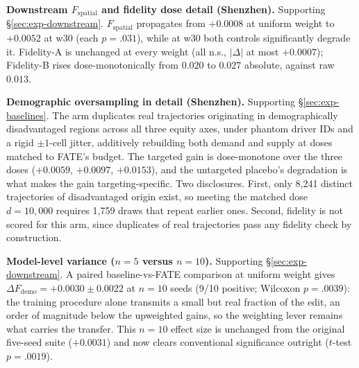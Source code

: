 \textbf{Downstream $F_{\mathrm{spatial}}$ and fidelity dose detail (Shenzhen).}
Supporting \S\ref{sec:exp-downstream}. $F_{\mathrm{spatial}}$ propagates from
$+0.0008$ at uniform weight to $+0.0052$ at w30 (each $p = .031$), while at w30
both controls significantly degrade it. Fidelity-A is unchanged at every weight
(all n.s., $|\Delta|$ at most $+0.0007$); Fidelity-B rises dose-monotonically
from $0.020$ to $0.027$ absolute, against raw $0.013$.

\textbf{Demographic oversampling in detail (Shenzhen).} Supporting
\S\ref{sec:exp-baselines}. The arm duplicates real trajectories originating in
demographically disadvantaged regions
\cite{kamirancalders2012,zietlow2022} across all three equity axes, under
phantom driver IDs and a rigid $\pm 1$-cell jitter, additively rebuilding both
demand and supply at doses matched to FATE's budget. The targeted gain is
dose-monotone over the three doses ($+0.0059$, $+0.0097$, $+0.0153$), and the
untargeted placebo's degradation is what makes the gain targeting-specific.
Two disclosures. First, only 8{,}241 distinct trajectories of disadvantaged
origin exist, so meeting the matched dose $d = 10{,}000$ requires 1{,}759
draws that repeat earlier ones. Second, fidelity is not scored for this arm,
since duplicates of real trajectories pass any fidelity check by construction.

\textbf{Model-level variance ($n = 5$ versus $n = 10$).} Supporting
\S\ref{sec:exp-downstream}. A paired baseline-vs-FATE comparison at uniform
weight gives $\Delta F_{\mathrm{demo}} = +0.0030 \pm 0.0022$ at $n = 10$
seeds (9/10 positive; Wilcoxon $p = .0039$): the training procedure alone
transmits a small but real fraction of the edit, an order of magnitude below
the upweighted gains, so the weighting lever remains what carries the
transfer. This $n = 10$ effect size is unchanged from the original five-seed
suite ($+0.0031$) and now clears conventional significance outright
($t$-test $p = .0019$).

